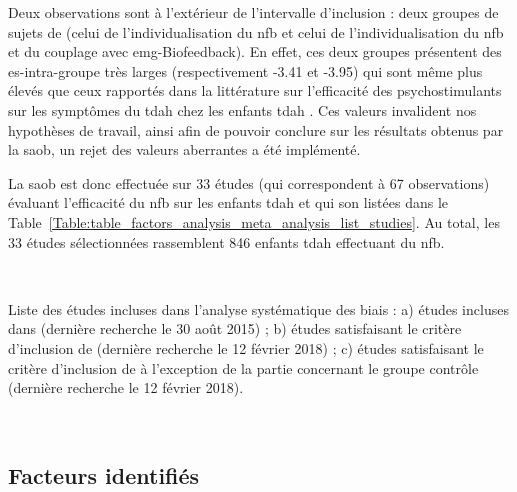 Deux observations sont à l'extérieur de l'intervalle d'inclusion : deux groupes de sujets de \citet{Bazanova2018} (celui de l'individualisation du \gls{nfb} et celui de
l'individualisation du \gls{nfb} et du couplage avec \gls{emg}-Biofeedback). En effet, ces deux groupes présentent des \gls{es}-intra-groupe très larges (respectivement -3.41 et -3.95)
qui sont même plus élevés que ceux rapportés dans la littérature sur l'efficacité des psychostimulants sur les symptômes du \gls{tdah} chez les enfants \gls{tdah} \citep{Luan2017}.
Ces valeurs invalident nos hypothèses de travail, ainsi afin de pouvoir conclure sur les résultats obtenus par la \gls{saob}, un rejet des valeurs aberrantes a été implémenté.

La \gls{saob} est donc effectuée sur 33 études (qui correspondent à 67 observations) évaluant l'efficacité du \gls{nfb} sur les enfants \gls{tdah} et qui son listées dans le 
Table~\ref{Table:table_factors_analysis_meta_analysis_list_studies}. Au total, les 33 études sélectionnées rassemblent 846 enfants \gls{tdah} effectuant du \gls{nfb}.

\newpage\
\begin{table}[h!]
  \centering
  \caption{Liste des études incluses dans l'analyse systématique des biais : a) études incluses dans \citet{Cortese2016}
	(dernière recherche le 30 août 2015) ; b) études satisfaisant le critère d'inclusion de \citet{Cortese2016} (dernière recherche le 12 février 2018) ; c) études 
	satisfaisant le critère d'inclusion de \citet{Cortese2016} à l'exception de la partie concernant le groupe contrôle (dernière recherche le 12 février 2018).}
  
  \label{Table:table_factors_analysis_meta_analysis_list_studies}
\end{table}

\newpage\
\subsection{Facteurs identifiés}

